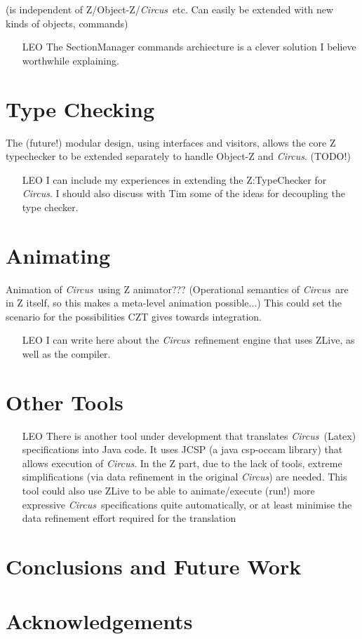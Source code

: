 \documentclass{llncs}
\newcommand{\Circus}{{\sf\slshape Circus}}
\begin{document}
  (is independent of Z/Object-Z/\Circus\ etc.
  Can easily be extended with new kinds of objects, commands)

    \begin{itemize}
        \item[LEO] The SectionManager commands archiecture is a clever solution I believe worthwhile explaining.
    \end{itemize}

\section{Type Checking}

      The (future!) modular design, using interfaces and visitors,
      allows the core Z typechecker to be extended separately
      to handle Object-Z and \Circus.  (TODO!)

    \begin{itemize}
        \item[LEO] I can include my experiences in extending the Z:TypeChecker for \Circus.
                    I should also discuss with Tim some of the ideas for decoupling the type checker.
    \end{itemize}

\section{Animating}

    Animation of \Circus\ using Z animator???
      (Operational semantics of \Circus\ are in Z itself, so this makes a meta-level animation possible...)
    This could set the scenario for the possibilities CZT gives towards integration.

    \begin{itemize}
        \item[LEO] I can write here about the \Circus\ refinement engine that uses ZLive, as well as the compiler.
    \end{itemize}


\section{Other Tools}

    \begin{itemize}
        \item[LEO]
        There is another tool under development that translates \Circus\ (Latex) specifications into Java code.
        It uses JCSP (a java csp-occam library) that allows execution of \Circus.
        In the Z part, due to the lack of tools, extreme simplifications (via data refinement in the original \Circus)
        are needed.
        This tool could also use ZLive to be able to animate/execute (run!) more expressive \Circus\ specifications quite
        automatically, or at least minimise the data refinement effort required for the translation
    \end{itemize}


\section{Conclusions and Future Work} \label{sec:conclusions}

\section*{Acknowledgements}



\end{document}
